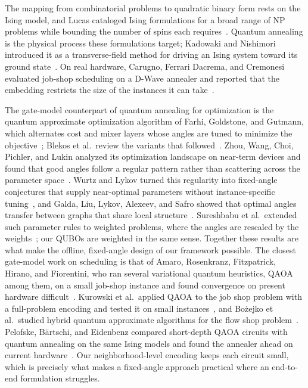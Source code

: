 \documentclass{svproc}
\newcommand{\rev}[1]{{\color{blue}#1}}
\newcommand{\rev}[1]{#1}
\begin{document}
The mapping from combinatorial problems to quadratic binary form rests on
the Ising model, and Lucas cataloged Ising formulations for a broad
range of NP problems while bounding the number of spins each
requires~\cite{lucas2014ising}. Quantum annealing is the physical process
these formulations target; Kadowaki and Nishimori introduced it as a
transverse-field method for driving an Ising system toward its ground
state~\cite{kadowaki1998}. \rev{On real hardware, Carugno, Ferrari Dacrema, and Cremonesi evaluated
job-shop scheduling on a D-Wave annealer and reported that the embedding
restricts the size of the instances it can take~\cite{carugno2022}.}

The gate-model counterpart of quantum annealing for optimization is the
quantum approximate optimization algorithm of Farhi, Goldstone, and
Gutmann, which alternates cost and mixer layers whose angles are tuned to
minimize the objective~\cite{farhi2014qaoa}\rev{; Blekos et al.\ review the
variants that followed~\cite{blekos2024}}. Zhou, Wang, Choi, Pichler,
and Lukin analyzed its optimization landscape on near-term devices and
found that good angles follow a regular pattern rather than scattering
across the parameter space~\cite{zhou2020}. Wurtz and Lykov turned this
regularity into fixed-angle conjectures that supply near-optimal
parameters without instance-specific tuning~\cite{wurtz2021fixed}, and
Galda, Liu, Lykov, Alexeev, and Safro showed that optimal angles transfer
between graphs that share local structure~\cite{galda2021}. \rev{Sureshbabu et
al.\ extended such parameter rules to weighted problems, where the angles are
rescaled by the weights~\cite{sureshbabu2024}; our QUBOs are weighted in the
same sense.} Together
these results are what make the offline, fixed-angle design of our
framework possible. The closest gate-model work on scheduling is that of
Amaro, Rosenkranz, Fitzpatrick, Hirano, and Fiorentini, who ran several
variational quantum heuristics, QAOA among them, on a small job-shop
instance and found convergence on present hardware difficult~\cite{amaro2022}.
\rev{Kurowski et al.\ applied QAOA to the job shop problem with a full-problem
encoding and tested it on small instances~\cite{kurowski2023}, and
Bo\.{z}ejko et al.\ studied hybrid quantum approximate algorithms for the flow
shop problem~\cite{bozejko2024cinti}. Pelofske, B\"{a}rtschi, and Eidenbenz compared
short-depth QAOA circuits with quantum annealing on the same Ising models and
found the annealer ahead on current hardware~\cite{pelofske2024}.}
Our neighborhood-level encoding keeps each circuit small, which is
precisely what makes a fixed-angle approach practical where an
end-to-end formulation struggles.
\end{document}
